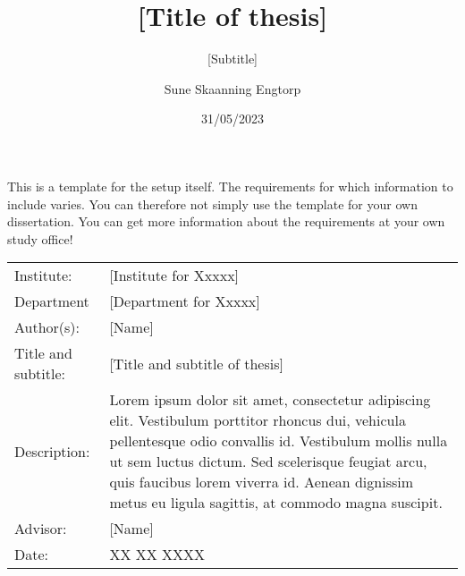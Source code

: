 \documentclass[12pt]{article}
\author{Sune Skaanning Engtorp}
\title{[Title of thesis]}
\subtitle{[Subtitle]}
\date{31/05/2023}
\begin{document}
\maketitle

\onehalfspacing

\noindent This is a template for the setup itself. The requirements for which information to include varies. You can therefore not simply use the template for your own dissertation. You can get more information about the requirements at your own study office!
\begin{table}[h]
\def\arraystretch{1.5}
\begin{tabularx}{\textwidth}{l X}
Institute: & {[Institute for Xxxxx]}  \\
Department & {[Department for Xxxxx]} \\
Author(s): & {[Name]} \\
Title and subtitle: & {[Title and subtitle of thesis]} \\
Description: & Lorem ipsum dolor sit amet, consectetur adipiscing elit. Vestibulum porttitor rhoncus dui, vehicula pellentesque odio convallis id. Vestibulum mollis nulla ut sem luctus dictum. Sed scelerisque feugiat arcu, quis faucibus lorem viverra id. Aenean dignissim metus eu ligula sagittis, at commodo magna suscipit. \\
Advisor: & {[Name]} \\
Date: & XX XX XXXX
\end{tabularx}
\end{table}
\newpage

\tableofcontents
\newpage
\end{document}
